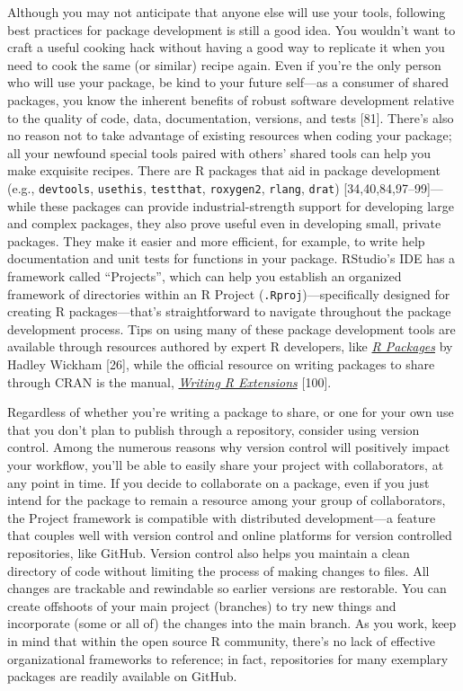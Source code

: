 \documentclass[10pt,letterpaper]{article}
\begin{document}
Although you may not anticipate that anyone else will use your tools,
following best practices for package development is still a good idea.
You wouldn't want to craft a useful cooking hack without having a good
way to replicate it when you need to cook the same (or similar) recipe
again. Even if you're the only person who will use your package, be kind
to your future self---as a consumer of shared packages, you know the
inherent benefits of robust software development relative to the quality
of code, data, documentation, versions, and tests {[}81{]}. There's also
no reason not to take advantage of existing resources when coding your
package; all your newfound special tools paired with others' shared
tools can help you make exquisite recipes. There are R packages that aid
in package development (e.g., \texttt{devtools}, \texttt{usethis},
\texttt{testthat}, \texttt{roxygen2}, \texttt{rlang}, \texttt{drat})
{[}34,40,84,97--99{]}---while these packages can provide
industrial-strength support for developing large and complex packages,
they also prove useful even in developing small, private packages. They
make it easier and more efficient, for example, to write help
documentation and unit tests for functions in your package. RStudio's
IDE has a framework called ``Projects'', which can help you establish an
organized framework of directories within an R Project
(\texttt{.Rproj})---specifically designed for creating R
packages---that's straightforward to navigate throughout the package
development process. Tips on using many of these package development
tools are available through resources authored by expert R developers,
like \href{https://r-pkgs.org/}{\emph{R Packages}} by Hadley Wickham
{[}26{]}, while the official resource on writing packages to share
through CRAN is the manual,
\href{https://cran.r-project.org/doc/manuals/r-release/R-exts.html}{\emph{Writing
R Extensions}} {[}100{]}.

Regardless of whether you're writing a package to share, or one for your
own use that you don't plan to publish through a repository, consider
using version control. Among the numerous reasons why version control
will positively impact your workflow, you'll be able to easily share
your project with collaborators, at any point in time. If you decide to
collaborate on a package, even if you just intend for the package to
remain a resource among your group of collaborators, the Project
framework is compatible with distributed development---a feature that
couples well with version control and online platforms for version
controlled repositories, like GitHub. Version control also helps you
maintain a clean directory of code without limiting the process of
making changes to files. All changes are trackable and rewindable so
earlier versions are restorable. You can create offshoots of your main
project (branches) to try new things and incorporate (some or all of)
the changes into the main branch. As you work, keep in mind that within
the open source R community, there's no lack of effective organizational
frameworks to reference; in fact, repositories for many exemplary
packages are readily available on GitHub.
\end{document}
